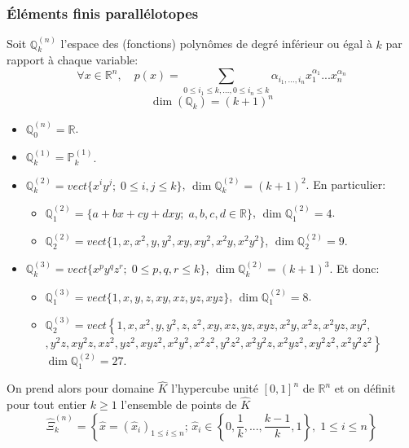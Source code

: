 \documentclass{beamer}
\begin{document}
\begin{frame}
\frametitle{Éléments finis parallélotopes}
Soit $\mathbb{Q}_k^{(n)}$ l'espace des (fonctions) polynômes de degré inférieur ou égal à $k$ par rapport à chaque variable: 
\begin{equation}
\forall x\in \mathbb{R}^n,\quad p(x)=\sum_{0\leq i_1\leq k,...,0\leq i_n\leq k}\alpha_{i_1,...,i_n}x_1^{\alpha_1}...x_n^{\alpha_n}
\end{equation}
\[\dim (\mathbb{Q}_k) = (k+ 1)^n\]


\begin{itemize}
\item $\mathbb{Q}_0^{(n)}=\mathbb{R}$.
\item $\mathbb{Q}_k^{(1)}=\mathbb{P}_k^{(1)}$.
\item $\mathbb{Q}_k^{(2)}=vect\{x^iy^j;\; 0\leq i,j \leq k\}$, $\dim \mathbb{Q}_k^{(2)}=(k+1)^2$.
En particulier: 
\begin{itemize}
\item $\mathbb{Q}_1^{(2)}=\{a+bx+cy+dxy;\; a,b,c,d\in \mathbb{R}\}$, $\dim \mathbb{Q}_1^{(2)}=4$.
\item $\mathbb{Q}_2^{(2)}=vect\{1,x,x^2,y,y^2,xy,xy^2,x^2y,x^2y^2\}$, $\dim \mathbb{Q}_2^{(2)}=9$.
\end{itemize}
\item $\mathbb{Q}_k^{(3)}=vect\{x^py^qz^r;\; 0\leq p,q,r \leq k\}$, $\dim \mathbb{Q}_k^{(2)}=(k+1)^3$.
Et donc: 
\begin{itemize}
\item $\mathbb{Q}_1^{(3)}=vect\{1,x,y,z,xy,xz,yz,xyz\}$, $\dim \mathbb{Q}_1^{(2)}=8$.
\item $\mathbb{Q}_2^{(3)}=vect\left\{
1,x,x^2,y,y^2,z,z^2,xy,xz,yz,xyz,x^2y,x^2z,x^2yz,xy^2,\right.$
$\left. ,y^2z,xy^2z,xz^2,yz^2,xyz^2,x^2y^2,x^2z^2,y^2z^2,x^2y^2z,x^2yz^2,xy^2z^2,x^2y^2z^2\right\}$
$\dim \mathbb{Q}_1^{(2)}=27$.
\end{itemize}
\end{itemize}

   On prend alors pour domaine $\widehat{K}$ l'hypercube unité $[0, 1]^n$ de $\mathbb{R}^n$ et on définit pour tout entier $k \geq 1$ l'ensemble de points de $\widehat{K}$
\begin{equation}
\widehat{\Xi}_k^{(n)}=\left\{\hat{x}=(\hat{x}_i)_{1\leq i\leq n};\, \hat{x}_i\in\left\{0,\frac 1k,...,\frac{k-1}{k},1\right\},\; 1\leq i\leq n\right\}
\end{equation}
\end{frame}
\end{document}
